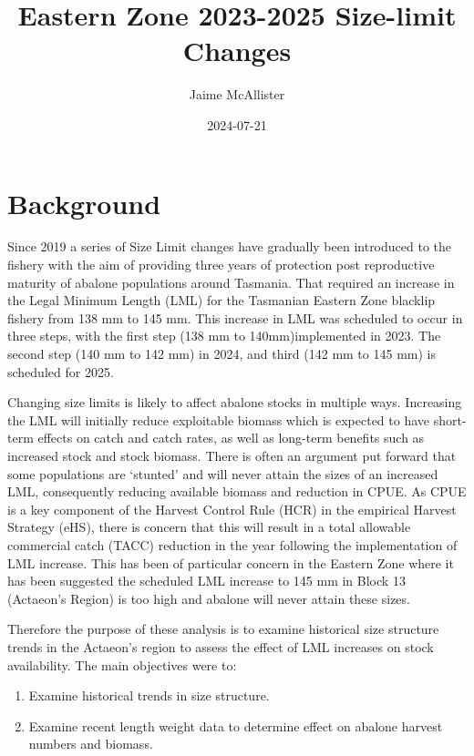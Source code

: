 \documentclass[
]{article}
\title{Eastern Zone 2023-2025 Size-limit Changes}
\author{Jaime McAllister}
\date{2024-07-21}
\providecommand{\tightlist}{%
  \setlength{\itemsep}{0pt}\setlength{\parskip}{0pt}}
\begin{document}
\maketitle

{
\setcounter{tocdepth}{2}
\tableofcontents
}
\section{Background}\label{background}

Since 2019 a series of Size Limit changes have gradually been introduced to the fishery with the aim of providing three years of protection post reproductive maturity of abalone populations around Tasmania. That required an increase in the Legal Minimum Length (LML) for the Tasmanian Eastern Zone blacklip fishery from 138 mm to 145 mm. This increase in LML was scheduled to occur in three steps, with the first step (138 mm to 140mm)implemented in 2023. The second step (140 mm to 142 mm) in 2024, and third (142 mm to 145 mm) is scheduled for 2025.

Changing size limits is likely to affect abalone stocks in multiple ways. Increasing the LML will initially reduce exploitable biomass which is expected to have short-term effects on catch and catch rates, as well as long-term benefits such as increased stock and stock biomass. There is often an argument put forward that some populations are `stunted' and will never attain the sizes of an increased LML, consequently reducing available biomass and reduction in CPUE. As CPUE is a key component of the Harvest Control Rule (HCR) in the empirical Harvest Strategy (eHS), there is concern that this will result in a total allowable commercial catch (TACC) reduction in the year following the implementation of LML increase. This has been of particular concern in the Eastern Zone where it has been suggested the scheduled LML increase to 145 mm in Block 13 (Actaeon's Region) is too high and abalone will never attain these sizes.

Therefore the purpose of these analysis is to examine historical size structure trends in the Actaeon's region to assess the effect of LML increases on stock availability. The main objectives were to:

\begin{enumerate}
\def\labelenumi{\arabic{enumi}.}
\tightlist
\item
  Examine historical trends in size structure.
\item
  Examine recent length weight data to determine effect on abalone harvest numbers and biomass.
\end{enumerate}
\end{document}
